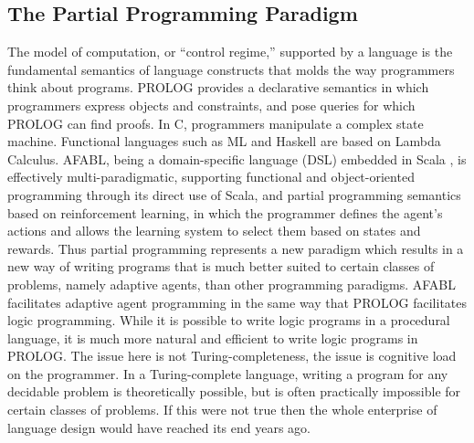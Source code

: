 \subsection{The Partial Programming Paradigm}

The model of computation, or ``control regime,'' supported by a language is the fundamental semantics of language constructs that molds the way programmers think about programs. PROLOG provides a declarative semantics in which programmers express objects and constraints, and pose queries for which PROLOG can find proofs.  In C, programmers manipulate a complex state machine. Functional languages such as ML and Haskell are based on Lambda Calculus. AFABL, being a domain-specific language (DSL) \cite{hudak1996building} embedded in Scala \cite{odersky2008programming,odersky2005scalable}, is effectively multi-paradigmatic, supporting functional and object-oriented programming through its direct use of Scala, and partial programming semantics based on reinforcement learning, in which the programmer defines the agent's actions and allows the learning system to select them based on states and rewards.  Thus partial programming represents a new paradigm which results in a new way of writing programs that is much better suited to certain classes of problems, namely adaptive agents, than other programming paradigms.  AFABL facilitates adaptive agent programming in the same way that PROLOG facilitates logic programming.  While it is possible to write logic programs in a procedural language, it is much more natural and efficient to write logic programs in PROLOG.  The issue here is not Turing-completeness, the issue is cognitive load on the programmer.  In a Turing-complete language, writing a program for any decidable problem is theoretically possible, but is often practically impossible for certain classes of problems.  If this were not true then the whole enterprise of language design would have reached its end years ago.

